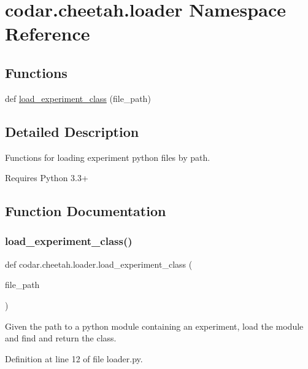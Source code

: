 \hypertarget{namespacecodar_1_1cheetah_1_1loader}{}\section{codar.\+cheetah.\+loader Namespace Reference}
\label{namespacecodar_1_1cheetah_1_1loader}
\subsection*{Functions}
\begin{DoxyCompactItemize}
\item 
def \hyperlink{namespacecodar_1_1cheetah_1_1loader_a64a522fe5f533ce89a37763862fd1a85}{load\+\_\+experiment\+\_\+class} (file\+\_\+path)
\end{DoxyCompactItemize}


\subsection{Detailed Description}
\begin{DoxyVerb}Functions for loading experiment python files by path.

Requires Python 3.3+
\end{DoxyVerb}
 

\subsection{Function Documentation}
\mbox{\label{namespacecodar_1_1cheetah_1_1loader_a64a522fe5f533ce89a37763862fd1a85}} 
\subsubsection{\texorpdfstring{load\+\_\+experiment\+\_\+class()}{load\_experiment\_class()}}
{\footnotesize\ttfamily def codar.\+cheetah.\+loader.\+load\+\_\+experiment\+\_\+class (\begin{DoxyParamCaption}\item[{}]{file\+\_\+path }\end{DoxyParamCaption})}

\begin{DoxyVerb}Given the path to a python module containing an experiment, load the
module and find and return the class.\end{DoxyVerb}
 

Definition at line 12 of file loader.\+py.

